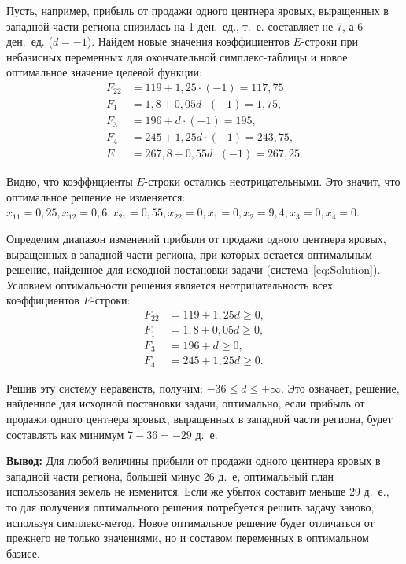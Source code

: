 Пусть, например, прибыль от продажи одного центнера яровых, выращенных в западной части региона 
снизилась на 1 ден.~ед., т.~е. составляет не 7, а 6 ден.~ед. ($ d = -1 $). Найдем новые значения 
коэффициентов $ E $-строки при небазисных переменных для окончательной симплекс-таблицы 
и новое оптимальное значение целевой функции:
\begin{equation}
    \begin{aligned}
      F_{22} &= 119 + 1{,}25 \cdot (-1) = 117{,}75 \\
      F_{1} &= 1{,}8 + 0{,}05d \cdot (-1) = 1{,}75, \\
      F_{3} &= 196 + d \cdot (-1) = 195, \\
      F_{4} &= 245 + 1{,}25d \cdot (-1) = 243{,}75, \\
      E &= 267{,}8 + 0{,}55d \cdot (-1) = 267{,}25.
    \end{aligned}
\end{equation}

Видно, что коэффициенты $ E $-строки остались неотрицательными. Это значит, что оптимальное решение 
не изменяется: $ x_{11} = 0{,}25, x_{12} = 0{,}6, x_{21} = 0{,}55,
x_{22} = 0, x_{1} = 0, x_{2} = 9{,}4, x_{3} = 0, x_{4} = 0 $. 


Определим диапазон изменений прибыли от продажи одного центнера яровых, выращенных в западной части региона,
при которых остается оптимальным решение, найденное для исходной постановки задачи (система~\eqref{eq:Solution}).
Условием оптимальности решения является неотрицательность всех коэффициентов $ E $-строки:
\begin{equation}
    \begin{aligned}
      F_{22} &= 119 + 1{,}25d \ge 0, \\
      F_{1} &= 1{,}8 + 0{,}05d \ge 0, \\
      F_{3} &= 196 + d \ge 0, \\
      F_{4} &= 245 + 1{,}25d \ge 0. 
    \end{aligned}
\end{equation}

Решив эту систему неравенств, получим: $ -36 \le d \le +\infty $. Это означает, решение,
найденное для исходной постановки задачи, оптимально, если прибыль от продажи одного центнера яровых,
выращенных в западной части региона, будет составлять как минимум $ 7 - 36 = -29 $ д.~е.

\textbf{Вывод:}
Для любой величины прибыли от продажи одного центнера яровых в западной части региона,
большей минус 26 д.~е, оптимальный план использования земель не изменится.
Если же убыток составит меньше 29 д.~е., то для получения оптимального решения потребуется решить задачу
заново, используя симплекс-метод.
Новое оптимальное решение будет отличаться от прежнего не только значениями, но и составом переменных в 
оптимальном базисе.

\newpage
